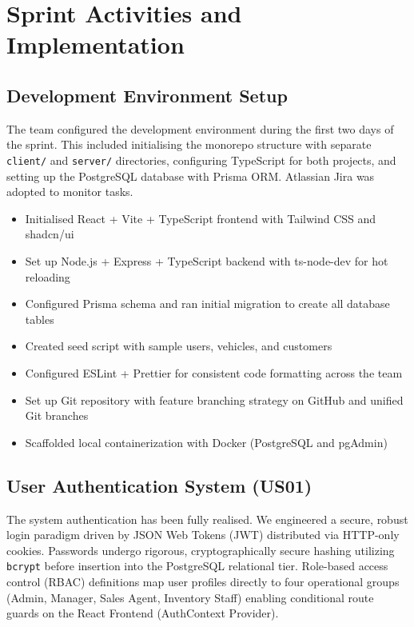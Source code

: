\documentclass[12pt,a4paper]{article}
\begin{document}
\section{Sprint Activities and Implementation}

\subsection{Development Environment Setup}

The team configured the development environment during the first two days of the sprint. This included initialising the monorepo structure with separate \texttt{client/} and \texttt{server/} directories, configuring TypeScript for both projects, and setting up the PostgreSQL database with Prisma ORM. Atlassian Jira was adopted to monitor tasks.

\begin{itemize}[leftmargin=1.5em, itemsep=4pt]
  \item Initialised React + Vite + TypeScript frontend with Tailwind CSS and shadcn/ui
  \item Set up Node.js + Express + TypeScript backend with ts-node-dev for hot reloading
  \item Configured Prisma schema and ran initial migration to create all database tables
  \item Created seed script with sample users, vehicles, and customers
  \item Configured ESLint + Prettier for consistent code formatting across the team
  \item Set up Git repository with feature branching strategy on GitHub and unified Git branches
  \item Scaffolded local containerization with Docker (PostgreSQL and pgAdmin)
\end{itemize}

\subsection{User Authentication System (US01)}

The system authentication has been fully realised. We engineered a secure, robust login paradigm driven by JSON Web Tokens (JWT) distributed via HTTP-only cookies. Passwords undergo rigorous, cryptographically secure hashing utilizing \texttt{bcrypt} before insertion into the PostgreSQL relational tier. Role-based access control (RBAC) definitions map user profiles directly to four operational groups (Admin, Manager, Sales Agent, Inventory Staff) enabling conditional route guards on the React Frontend (AuthContext Provider).
\end{document}
